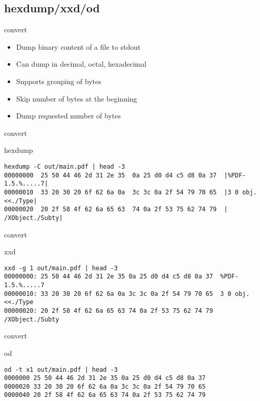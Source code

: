 \subsection{hexdump/xxd/od}

\begin{frame}[fragile]{convert}
  \begin{itemize}
    \pause \item Dump binary content of a file to stdout
    \pause \item Can dump in decimal, octal, hexadecimal
    \pause \item Supports grouping of bytes
    \pause \item Skip number of bytes at the beginning
    \pause \item Dump requested number of bytes
  \end{itemize}
\end{frame}

\begin{frame}[fragile]{convert}
  \begin{exampleblock}{hexdump}
    \begin{lstlisting}[showstringspaces=false,basicstyle=\tiny]
hexdump -C out/main.pdf | head -3
00000000  25 50 44 46 2d 31 2e 35  0a 25 d0 d4 c5 d8 0a 37  |%PDF-1.5.%.....7|
00000010  33 20 30 20 6f 62 6a 0a  3c 3c 0a 2f 54 79 70 65  |3 0 obj.<<./Type|
00000020  20 2f 58 4f 62 6a 65 63  74 0a 2f 53 75 62 74 79  | /XObject./Subty|
    \end{lstlisting}
  \end{exampleblock}
\end{frame}

\begin{frame}[fragile]{convert}
  \begin{exampleblock}{xxd}
    \begin{lstlisting}[showstringspaces=false,basicstyle=\tiny]
xxd -g 1 out/main.pdf | head -3
00000000: 25 50 44 46 2d 31 2e 35 0a 25 d0 d4 c5 d8 0a 37  %PDF-1.5.%.....7
00000010: 33 20 30 20 6f 62 6a 0a 3c 3c 0a 2f 54 79 70 65  3 0 obj.<<./Type
00000020: 20 2f 58 4f 62 6a 65 63 74 0a 2f 53 75 62 74 79   /XObject./Subty
    \end{lstlisting}
  \end{exampleblock}
\end{frame}

\begin{frame}[fragile]{convert}
  \begin{exampleblock}{od}
    \begin{lstlisting}[showstringspaces=false,basicstyle=\tiny]
od -t x1 out/main.pdf | head -3
0000000 25 50 44 46 2d 31 2e 35 0a 25 d0 d4 c5 d8 0a 37
0000020 33 20 30 20 6f 62 6a 0a 3c 3c 0a 2f 54 79 70 65
0000040 20 2f 58 4f 62 6a 65 63 74 0a 2f 53 75 62 74 79
    \end{lstlisting}
  \end{exampleblock}
\end{frame}

